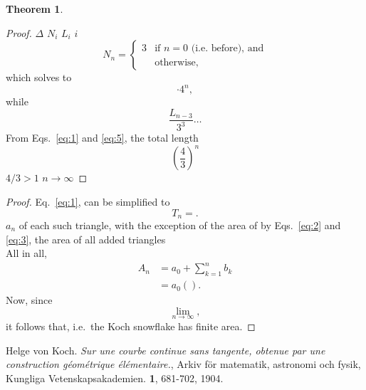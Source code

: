 \documentclass[12pt,a4paper]{article}
\newtheorem{theorem}{Theorem}
\begin{document}
\begin{theorem}
  
\end{theorem}
\begin{proof}
  $\Delta$ $N_i$ $L_i$ $i$ 
\begin{displaymath}
  N_n =
    \begin{cases}
      3             & \text{if $n=0$ (i.e.\ before), and} \\
      & \text{otherwise,}
    \end{cases}
\end{displaymath}
which solves to 
\begin{equation}
  \label{eq:1}
  \cdot 4^n,
\end{equation}
while  
\begin{equation}
  \label{eq:5}
  \frac{L_{n-3}}{3^3}
  \ldots
\end{equation}
From Eqs.~\ref{eq:1} and \ref{eq:5}, the total length 
\begin{displaymath} \left(
  \frac{4}{3}\right)^n
\end{displaymath}
$4/3>1$ $n
\to \infty$
\end{proof}
\begin{proof}
Eq.~\ref{eq:1}, can be simplified to 
  \begin{equation}
    \label{eq:2}
    T_n = .
  \end{equation}
  $a_n$ of each such triangle, with the exception of the area
  of
by Eqs.~\ref{eq:2} and \ref{eq:3}, the area of all added triangles 
  \begin{equation*}
  \end{equation*}
   All in all, 
   \begin{align*}
     A_n &= a_0 + \sum_{k=1}^n b_k \\
           &=  a_0\left( \right).
   \end{align*}
  Now, since
\begin{displaymath}
   \lim_{n \to \infty},
\end{displaymath}
 it follows that, i.e.\ the Koch snowflake has finite area.  
\end{proof}


\begin{thebibliography}{99}
   Helge von Koch. 
    \emph{Sur une courbe continue sans tangente, obtenue par une
    construction géométrique élémentaire.}, 
    Arkiv för matematik, astronomi och fysik, 
    Kungliga Vetenskapsakademien. 
    \textbf{1}, 681-702, 1904.
\end{thebibliography}
\end{document}
